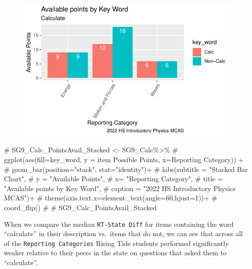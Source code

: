 \documentclass[
  letterpaper,
  DIV=11,
  numbers=noendperiod]{scrartcl}
\newenvironment{Shaded}{\begin{snugshade}}{\end{snugshade}}
\newcommand{\CommentTok}[1]{\textcolor[rgb]{0.37,0.37,0.37}{#1}}
\begin{document}
\begin{figure}[H]

{\centering \includegraphics{theresaSzczepanski_final_files/figure-pdf/unnamed-chunk-22-1.pdf}

}

\end{figure}

\begin{Shaded}
\begin{Highlighting}[]
 \CommentTok{\# SG9\_Calc\_PointsAvail\_Stacked \textless{}{-} SG9\_Calc\%\textgreater{}\%}
 \CommentTok{\#   ggplot(aes(fill=key\_word, y = \textasciigrave{}item Possible Points\textasciigrave{}, x=\textasciigrave{}Reporting Category\textasciigrave{})) +}
 \CommentTok{\#     geom\_bar(position="stack", stat="identity")+}
 \CommentTok{\#   labs(subtitle = "Stacked Bar Chart",}
 \CommentTok{\#        y = "Available Points",}
 \CommentTok{\#       x= "Reporting Category",}
 \CommentTok{\#       title = "Available points by Key Word",}
 \CommentTok{\#      caption = "2022 HS Introductory Physics MCAS")+}
 \CommentTok{\#      theme(axis.text.x=element\_text(angle=60,hjust=1))+}
 \CommentTok{\#   coord\_flip()}
 \CommentTok{\# }
 \CommentTok{\# SG9\_Calc\_PointsAvail\_Stacked}
\end{Highlighting}
\end{Shaded}

When we compare the median \texttt{RT-State\ Diff} for items containing
the word ``calculate'' in their description vs.~items that do not, we
can see that across all of the \texttt{Reporting\ Categories} Rising
Tide students performed significantly weaker relative to their peers in
the state on questions that asked them to ``calculate''.
\end{document}
